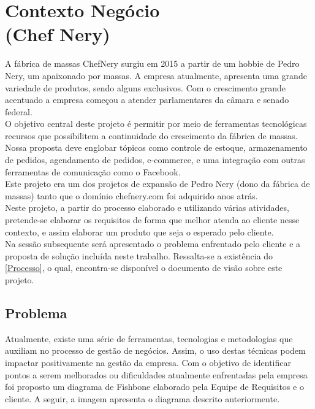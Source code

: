 
\chapter[Contexto do Negócio]{Contexto Negócio \\ (Chef Nery)}
A  fábrica de massas ChefNery surgiu em 2015 a partir de um hobbie de Pedro Nery, um apaixonado por massas.  A empresa atualmente, apresenta uma grande variedade de produtos, sendo alguns exclusivos. Com o crescimento grande acentuado a empresa começou a atender parlamentares da câmara e senado federal.\\
\tab O objetivo central deste projeto é permitir por meio de ferramentas tecnológicas recursos que possibilitem a continuidade do crescimento da fábrica de massas. Nossa proposta deve englobar tópicos como controle de estoque, armazenamento de pedidos, agendamento de pedidos, e-commerce, e uma integração com outras ferramentas de comunicação como o Facebook.\\
\tab Este projeto era um dos projetos de expansão de Pedro Nery (dono da fábrica de massas) tanto que o domínio chefnery.com foi adquirido anos atrás.\\
\tab Neste projeto, a partir do processo elaborado e utilizando várias atividades, pretende-se elaborar os requisitos de forma que melhor atenda ao cliente nesse contexto, e assim elaborar um produto que seja o esperado pelo cliente. \\
\tab Na sessão subsequente será apresentado o problema enfrentado pelo cliente e a proposta de solução incluída neste trabalho. Ressalta-se a existência do \ref{Processo}, o qual, encontra-se disponível o documento de visão sobre este projeto. \\


{\large {\section { Problema \\ } } }

Atualmente, existe uma série de ferramentas, tecnologias e metodologias que auxiliam no processo de gestão de negócios.  Assim, o uso destas técnicas podem impactar positivamente na gestão da empresa. Com o objetivo de identificar  pontos a serem melhorados ou dificuldades atualmente enfrentadas pela empresa foi proposto um diagrama de Fishbone elaborado pela Equipe de Requisitos e o cliente. A seguir, a imagem apresenta o diagrama descrito anteriormente.\\

